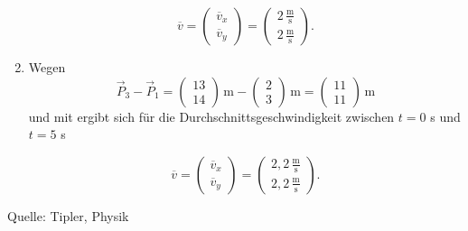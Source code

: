 \begin{MExercises}
\begin{MExercise}
\begin{MSolution}
\begin{enumerate}
                 \begin{equation*}
                 \overline{v}= \left(\begin{array}{c} \overline{v}_x \\ \overline{v}_y \end{array}\right)=\left(\begin{array}{c} 2\,\frac{\text{m}}{\text{s}}\\ 2\,\frac{\text{m}}{\text{s}} \end{array}\right).
                 \end{equation*}
                 \item  Wegen 
                  \begin{equation*}
                  \vec{P}_3-\vec{P}_1=\left(\begin{array}{c} 13 \\ 14 \end{array}\right)\,\text{m}-\left(\begin{array}{c} 2 \\ 3 \end{array}\right)\,\text{m}=\left(\begin{array}{c} 11 \\11 \end{array}\right)\,\text{m}
                   \end{equation*} und mit  ergibt sich f\"ur die Durchschnittsgeschwindigkeit zwischen $t=0$ s und $t=5$ s
                                 
                   \begin{equation*}
                   \overline{v}= \left(\begin{array}{c} \overline{v}_x \\ \overline{v}_y \end{array}\right)=\left(\begin{array}{c} {2,2}\,\frac{\text{m}}{\text{s}}\\ {2,2}\,\frac{\text{m}}{\text{s}} \end{array}\right).
                   \end{equation*}
                 \end{enumerate}
                 
                 \end{MSolution}
                 
                 Quelle: Tipler, Physik
                 \end{MExercise}

\end{MExercises}
   
